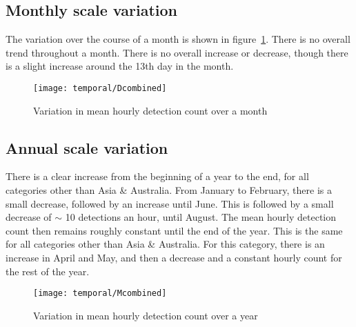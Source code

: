 \subsection{Monthly scale variation}
The variation over the course of a month is shown in figure~\ref{fig:temp:day}. There is no overall trend throughout a month. There is no overall increase or decrease, though there is a slight increase around the 13th day in the month.
\begin{figure}[h!]
	\centering
	\texttt{[image: temporal/Dcombined]}
	\caption{Variation in mean hourly detection count over a month
		\label{fig:temp:day}}
\end{figure}
\subsection{Annual scale variation}
There is a clear increase from the beginning of a year to the end, for all categories other than Asia \& Australia. From January to February, there is a small decrease, followed by an increase until June. This is followed by a small decrease of $\sim$ 10 detections an hour, until August. The mean hourly detection count then remains roughly constant until the end of the year. This is the same for all categories other than Asia \& Australia. For this category, there is an increase in April and May, and then a decrease and a constant hourly count for the rest of the year.
\begin{figure}[h!]
	\centering
	\texttt{[image: temporal/Mcombined]}
	\caption{Variation in mean hourly detection count over a year
		\label{fig:temp:month}}
\end{figure}
